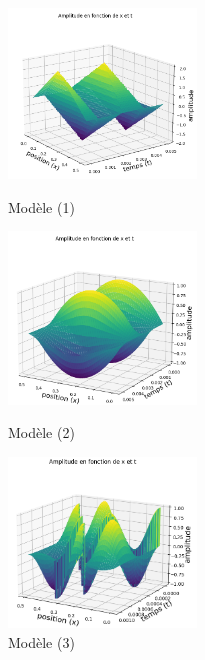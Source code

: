 \subtitle\underline{Euler explicite}



\begin{figure}[H]
  \includegraphics[width=5cm]{1.png}
  \caption{Modèle (1)}\label{fig}
\endminipage\hfill
{}
  \includegraphics[width=5cm]{2.png}
  \caption{Modèle (2)}\label{fig}
\endminipage\hfill
{}%
  \includegraphics[width=5cm]{7_explicite.png}
  \caption{Modèle (3)}\label{fig}
\endminipage
\end{figure}



\subtitle\underline{Euler implicite}

